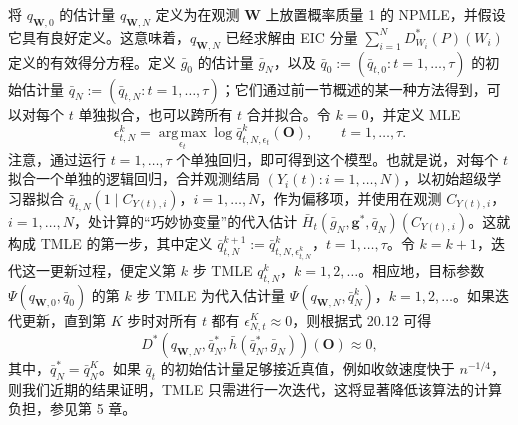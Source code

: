 将 $q_{\mathbf W,0}$ 的估计量 $q_{\mathbf W,N}$ 定义为在观测 $\mathbf W$ 上放置概率质量 1 的 NPMLE，并假设它具有良好定义。这意味着，$q_{\mathbf W,N}$ 已经求解由 EIC 分量 $\sum_{i=1}^ND^*_{W_i}(P)(W_i)$ 定义的有效得分方程。定义 $\bar g_0$ 的估计量 $\bar g_N$，以及 $\bar q_0:=(\bar q_{t,0}:t=1,\ldots,\tau)$ 的初始估计量 $\bar q_N:=(\bar q_{t,N}:t=1,\ldots,\tau)$；它们通过前一节概述的某一种方法得到，可以对每个 $t$ 单独拟合，也可以跨所有 $t$ 合并拟合。令 $k=0$，并定义 MLE
\[
 \epsilon^k_{t,N}=\operatorname*{arg\,max}_{\epsilon_t}
       \log\bar q^k_{t,N,\epsilon_t}(\mathbf O),
       \qquad t=1,\ldots,\tau.
\]
注意，通过运行 $t=1,\ldots,\tau$ 个单独回归，即可得到这个模型。也就是说，对每个 $t$ 拟合一个单独的逻辑回归，合并观测结局 $(Y_i(t):i=1,\ldots,N)$，以初始超级学习器拟合 $\bar q_{t,N}(1\mid C_{Y(t),i})$，$i=1,\ldots,N$，作为偏移项，并使用在观测 $C_{Y(t),i}$，$i=1,\ldots,N$，处计算的“巧妙协变量”的代入估计 $\bar H_t(\bar g_N,\mathbf g^*,\bar q_N)(C_{Y(t),i})$。这就构成 TMLE 的第一步，其中定义 $\bar q^{k+1}_{t,N}:=\bar q^k_{t,N,\epsilon^k_{t,N}}$，$t=1,\ldots,\tau$。令 $k=k+1$，迭代这一更新过程，便定义第 $k$ 步 TMLE $q^k_{t,N}$，$k=1,2,\ldots$。相应地，目标参数 $\Psi(q_{\mathbf W,0},\bar q_0)$ 的第 $k$ 步 TMLE 为代入估计量 $\Psi(q_{\mathbf W,N},\bar q_N^k)$，$k=1,2,\ldots$。如果迭代更新，直到第 $K$ 步时对所有 $t$ 都有 $\epsilon^K_{N,t}\approx0$，则根据式 20.12 可得
\[
 D^*(q_{\mathbf W,N},\bar q_N^*,\bar h(\bar q_N^*,\bar g_N))(\mathbf O)\approx0,
\]
其中，$\bar q_N^*=\bar q_N^K$。如果 $\bar q_t$ 的初始估计量足够接近真值，例如收敛速度快于 $n^{-1/4}$，则我们近期的结果证明，TMLE 只需进行一次迭代，这将显著降低该算法的计算负担，参见第 5 章。
